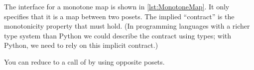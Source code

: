 
The interface for a monotone map is shown in \cref{lst:MonotoneMap}.
It only specifies that it is a map between two posets.
The implied ``contract'' is the monotonicity property that must hold. (In programming languages with a richer type system than Python we could describe the contract using types; with Python, we need to rely on this implicit contract.)


\begin{widepar}
\end{widepar}

\begin{hint}
    You can reduce  to a call of  by using opposite posets.
\end{hint}
